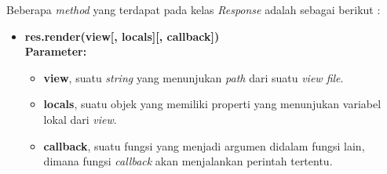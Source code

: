 Beberapa \textit{method} yang terdapat pada kelas \textit{Response} adalah sebagai berikut : 

\begin{itemize}
%	
%	
%	
%	
%	
%	
	
	\item \textbf{res.render(view[, locals][, callback])} \\ \textbf{Parameter:}
	\begin{itemize}
		\item \textbf{view}, suatu \textit{string} yang menunjukan \textit{path} dari suatu \textit{view file}.
		\item \textbf{locals}, suatu objek yang memiliki properti yang menunjukan variabel lokal dari \textit{view}.
		\item \textbf{callback}, suatu fungsi yang menjadi argumen didalam fungsi lain, dimana fungsi \textit{callback} akan menjalankan perintah tertentu. 
	\end{itemize}
	

\end{itemize}
